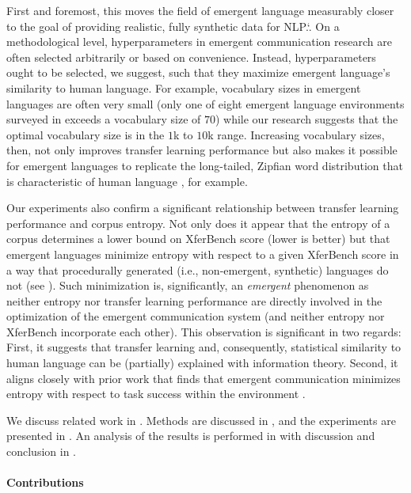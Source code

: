 First and foremost, this moves the field of emergent language measurably closer to the goal of providing realistic, fully synthetic data for NLP.\spacefactor\sfcode`.{}
On a methodological level, hyperparameters in emergent communication research are often selected arbitrarily or based on convenience.
Instead, hyperparameters ought to be selected, we suggest, such that they maximize emergent language's similarity to human language.
For example, vocabulary sizes in emergent languages are often very small (only one of eight emergent language environments surveyed in \citet{elcc} exceeds a vocabulary size of $70$) while our research suggests that the optimal vocabulary size is in the $1$k to $10$k range.
Increasing vocabulary sizes, then, not only improves transfer learning performance but also makes it possible for emergent languages to replicate the long-tailed, Zipfian word distribution that is characteristic of human language \citep{zipf1949least,piantadosi2014zipf}, for example.

Our experiments also confirm a significant relationship between transfer learning performance and corpus entropy.
Not only does it appear that the entropy of a corpus determines a lower bound on XferBench score (lower is better) but that emergent languages minimize entropy with respect to a given XferBench score in a way that procedurally generated (i.e., non-emergent, synthetic) languages do not (see ).
Such minimization is, significantly, an \emph{emergent} phenomenon as neither entropy nor transfer learning performance are directly involved in the optimization of the emergent communication system (and neither entropy nor XferBench incorporate each other).
This observation is significant in two regards:
  First, it suggests that transfer learning and, consequently, statistical similarity to human language can be (partially) explained with information theory.
  Second, it aligns closely with prior work that finds that emergent communication minimizes entropy with respect to task success within the environment \citep{kharitonov2020entmin,chaabouni2022emergent}.

We discuss related work in .
Methods are discussed in , and the experiments are presented in .
An analysis of the results is performed in  with discussion and conclusion in .

\paragraph{Contributions}

